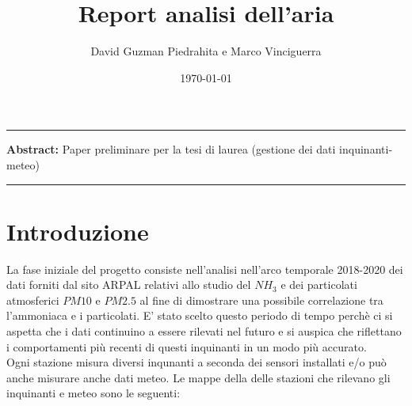 \documentclass{article}
\title{Report analisi dell'aria}
\author{David Guzman Piedrahita e Marco Vinciguerra}
\date{\today}
\begin{document}
\maketitle

\par\noindent\rule{\textwidth}{0.4pt}
\textbf{Abstract:} Paper preliminare per la tesi di laurea (gestione dei dati inquinanti-meteo)
\par\noindent\rule{\textwidth}{0.4pt}

\section{Introduzione}
La fase iniziale del progetto consiste nell'analisi nell'arco temporale 2018-2020 dei dati 
forniti dal sito ARPAL relativi allo studio del $NH_{3}$ e dei particolati atmosferici $PM10$ e $PM2.5$ al 
fine di dimostrare una possibile correlazione tra l'ammoniaca e i particolati. 
E' stato scelto questo periodo di tempo perchè ci si aspetta che i dati continuino a essere rilevati nel futuro
e si auspica che riflettano i comportamenti più recenti di questi inquinanti in un modo più accurato.
\\Ogni stazione misura diversi inqunanti a seconda dei sensori installati e/o può anche misurare anche dati meteo.
Le mappe della delle stazioni che rilevano gli inquinanti e meteo sono le 
seguenti:
\end{document}
